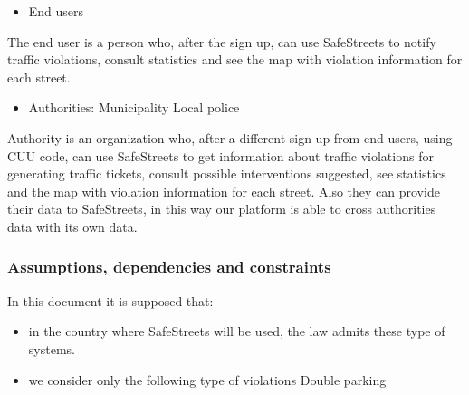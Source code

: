 \begin{itemize}
	\item End users
\end{itemize}

The end user is a person who, after the sign up, can use SafeStreets to notify traffic violations, consult statistics and see the map with violation information for each street.

\begin{itemize}
	\item Authorities:
	\subitem Municipality
	\subitem Local police
\end{itemize}


Authority is an organization who, after a different sign up from end users, using CUU code, can use SafeStreets to get information about traffic violations for generating traffic tickets, consult possible interventions suggested, see statistics and the map with violation information for each street.
Also they can provide their data to SafeStreets, in this way our platform is able to cross authorities data with its own data.

\subsubsection{Assumptions, dependencies and constraints}
	In this document it is supposed that:
\begin{itemize}
	\item 
	in the country where SafeStreets will be used, the law admits these type of systems.
	
	\item 
	we consider only the following type of violations
	\subitem
	Double parking
	\subitem
\end{itemize}



